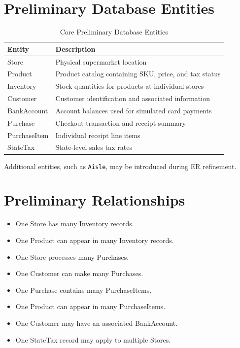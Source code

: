 \documentclass[11pt, a4paper]{article}
\begin{document}
\section{Preliminary Database Entities}
\begin{table}[htbp]
    \centering
    \begin{tabularx}{\textwidth}{l X}
        \toprule
        \textbf{Entity} & \textbf{Description} \\
        \midrule
        Store        & Physical supermarket location \\
        Product      & Product catalog containing SKU, price, and tax status \\
        Inventory    & Stock quantities for products at individual stores \\
        Customer     & Customer identification and associated information \\
        BankAccount  & Account balances used for simulated card payments \\
        Purchase     & Checkout transaction and receipt summary \\
        PurchaseItem & Individual receipt line items \\
        StateTax     & State-level sales tax rates \\
        \bottomrule
    \end{tabularx}
    \caption{Core Preliminary Database Entities}
    \label{tab:entities}
\end{table}

Additional entities, such as \texttt{Aisle}, may be introduced during ER refinement.

\section{Preliminary Relationships}
\begin{itemize}[leftmargin=1.5em, itemsep=2pt]
    \item One Store has many Inventory records.
    \item One Product can appear in many Inventory records.
    \item One Store processes many Purchases.
    \item One Customer can make many Purchases.
    \item One Purchase contains many PurchaseItems.
    \item One Product can appear in many PurchaseItems.
    \item One Customer may have an associated BankAccount.
    \item One StateTax record may apply to multiple Stores.
\end{itemize}
\end{document}
